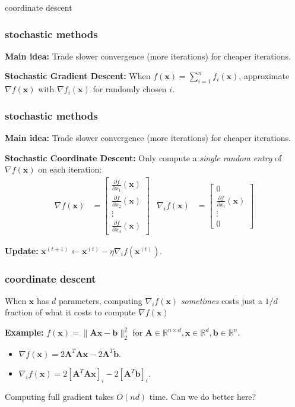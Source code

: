 \documentclass[compress]{beamer}
\newcommand{\bv}[1]{\mathbf{#1}}
\newcommand{\R}{\mathbb{R}}
\begin{document}
\begin{frame}[standout]
	\begin{center}
		\large coordinate descent
	\end{center}
\end{frame}

\begin{frame}
	\frametitle{stochastic methods}
	\textbf{Main idea:} Trade slower convergence (more iterations) for cheaper iterations. 
	\vspace{2em}
	
	\textbf{Stochastic Gradient Descent:}
	When $f(\bv{x}) = \sum_{i=1}^n f_i(\bv{x})$, approximate $\nabla f(\bv{x})$ with $\nabla f_i(\bv{x})$ for randomly chosen $i$. 
\end{frame}

\begin{frame}
	\frametitle{stochastic methods}
	\textbf{Main idea:} Trade slower convergence (more iterations) for cheaper iterations. 
	\vspace{2em}
	
	\textbf{Stochastic \alert{Coordinate Descent}:}
	Only compute a \emph{single random entry} of $\nabla f(\bv{x})$ on each iteration:
	\begin{align*}
	\nabla f(\bv{x}) &= 
	\begin{bmatrix}
	\frac{\partial f}{\partial x_1}(\bv{x}) \\ \frac{\partial f}{\partial x_2}(\bv{x}) \\ \vdots \\ \frac{\partial f}{\partial x_d}(\bv{x})  
	\end{bmatrix} & 	\nabla_i f(\bv{x}) &= 
	\begin{bmatrix}
	0\\ \frac{\partial f}{\partial x_i}(\bv{x}) \\ \vdots \\ 0
	\end{bmatrix} 
	\end{align*}
	
\textbf{Update:} $\bv{x}^{(t+1)}\leftarrow \bv{x}^{(t)} - \eta \nabla_i f(\bv{x}^{(t)})$.
\end{frame}

\begin{frame}[t]
	\frametitle{coordinate descent}
	When $\bv{x}$ has $d$ parameters, computing $\nabla_i f(\bv{x})$ \emph{sometimes} costs just a $1/d$ fraction of what it costs to compute $\nabla f(\bv{x})$ 
	
	\vspace{1em}
	\textbf{Example:} $f(\bv{x}) = \|\bv{A}\bv{x} - \bv{b}\|_2^2$ for $\bv{A} \in \R^{n\times d}, \bv{x} \in \R^{d}, \bv{b} \in \R^n$. 
	\begin{itemize}
		\item $\nabla f(\bv{x}) = 2\bv{A}^T\bv{A}\bv{x} - 2\bv{A}^T\bv{b}$.
		\item $\nabla_i f(\bv{x}) = 2\left[\bv{A}^T\bv{A}\bv{x}\right]_i - 2\left[\bv{A}^T\bv{b}\right]_i$.
	\end{itemize}

Computing full gradient takes $O(nd)$ time. Can we do better here?
\end{frame}
\end{document}
